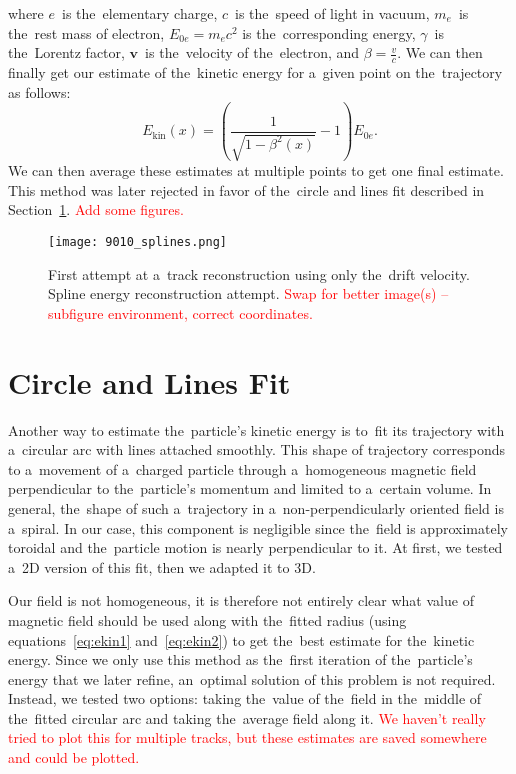		where $e$~is the~elementary charge, $c$~is the~speed of light in vacuum, $m_e$~is the~rest mass of electron, $E_{0e} = m_e c^2$ is the~corresponding energy, $\gamma$~is the~Lorentz factor, $\bm{v}$~is the~velocity of the~electron, and $\beta = \frac{v}{c}$. We can then finally get our estimate of the~kinetic energy for a~given point on the~trajectory as follows:
			\begin{equation}
				\label{eq:ekin2}
				E_\text{kin}(x) = \left(\frac{1}{\sqrt{1-\beta^2(x)}}-1\right)E_{0e}.
			\end{equation}
		We can then average these estimates at multiple points to get one final estimate. This method was later rejected in favor of the~circle and lines fit described in Section~\ref{sec:clines}.
		\textcolor{red}{Add some figures.}
		
		\begin{figure}
			\centering
			\texttt{[image: 9010\_splines.png]}
			\caption{First attempt at a~track reconstruction using only the~drift velocity. Spline energy reconstruction attempt. \textcolor{red}{Swap for better image(s) -- subfigure environment, correct coordinates.}}
			\label{fig:9010splines}
		\end{figure}
	
	\section{Circle and Lines Fit}
	\label{sec:clines}
		Another way to estimate the~particle's kinetic energy is to~fit its trajectory with a~circular arc with lines attached smoothly. This shape of trajectory corresponds to a~movement of a~charged particle through a~homogeneous magnetic field perpendicular to the~particle's momentum and limited to a~certain volume. In general, the~shape of such a~trajectory in a~non-perpendicularly oriented field is a~spiral. In our case, this component is negligible since the~field is approximately toroidal and the~particle motion is nearly perpendicular to it. At first, we tested a~2D version of this fit, then we adapted it to 3D.
		
		Our field is not homogeneous, it is therefore not entirely clear what value of magnetic field should be used along with the~fitted radius (using equations~\ref{eq:ekin1} and~\ref{eq:ekin2}) to get the~best estimate for the~kinetic energy. Since we only use this method as the~first iteration of the~particle's energy that we later refine, an~optimal solution of this problem is not required. Instead, we tested two options: taking the~value of the~field in the~middle of the~fitted circular arc and taking the~average field along it. \textcolor{red}{We haven't really tried to plot this for multiple tracks, but these estimates are saved somewhere and could be plotted.}
		

